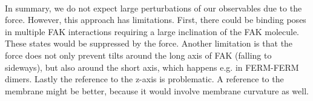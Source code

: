 %
%
%
\\
In summary, we do not expect large perturbations of our observables due to the force. However, this approach has limitations. First, there could be binding poses in multiple FAK interactions requiring a large inclination of the FAK molecule. These states would be suppressed by the force. Another limitation is that the force does not only prevent tilts around the long axis of FAK (falling to sideways), but also around the short axis, which happens e.g. in FERM-FERM dimers. Lastly the reference to the z-axis is problematic. A reference to the membrane might be better, because it would involve membrane curvature as well.
